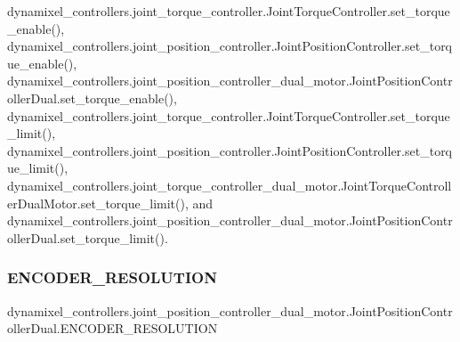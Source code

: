 dynamixel\+\_\+controllers.\+joint\+\_\+torque\+\_\+controller.\+Joint\+Torque\+Controller.\+set\+\_\+torque\+\_\+enable(), dynamixel\+\_\+controllers.\+joint\+\_\+position\+\_\+controller.\+Joint\+Position\+Controller.\+set\+\_\+torque\+\_\+enable(), dynamixel\+\_\+controllers.\+joint\+\_\+position\+\_\+controller\+\_\+dual\+\_\+motor.\+Joint\+Position\+Controller\+Dual.\+set\+\_\+torque\+\_\+enable(), dynamixel\+\_\+controllers.\+joint\+\_\+torque\+\_\+controller.\+Joint\+Torque\+Controller.\+set\+\_\+torque\+\_\+limit(), dynamixel\+\_\+controllers.\+joint\+\_\+position\+\_\+controller.\+Joint\+Position\+Controller.\+set\+\_\+torque\+\_\+limit(), dynamixel\+\_\+controllers.\+joint\+\_\+torque\+\_\+controller\+\_\+dual\+\_\+motor.\+Joint\+Torque\+Controller\+Dual\+Motor.\+set\+\_\+torque\+\_\+limit(), and dynamixel\+\_\+controllers.\+joint\+\_\+position\+\_\+controller\+\_\+dual\+\_\+motor.\+Joint\+Position\+Controller\+Dual.\+set\+\_\+torque\+\_\+limit().

\mbox{\label{classdynamixel__controllers_1_1joint__position__controller__dual__motor_1_1_joint_position_controller_dual_acbcd0c5b7678d6d67500c6a09b490718}} 
\subsubsection{\texorpdfstring{E\+N\+C\+O\+D\+E\+R\+\_\+\+R\+E\+S\+O\+L\+U\+T\+I\+ON}{ENCODER\_RESOLUTION}}
{\footnotesize\ttfamily dynamixel\+\_\+controllers.\+joint\+\_\+position\+\_\+controller\+\_\+dual\+\_\+motor.\+Joint\+Position\+Controller\+Dual.\+E\+N\+C\+O\+D\+E\+R\+\_\+\+R\+E\+S\+O\+L\+U\+T\+I\+ON}



